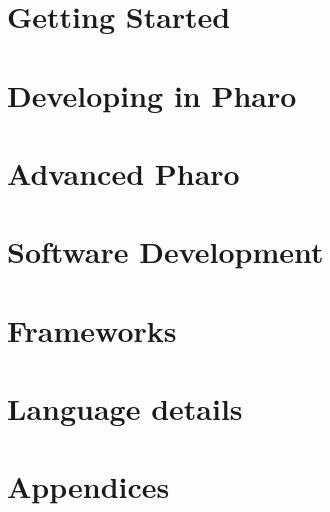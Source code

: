 \documentclass[a4paper,10pt,twoside]{book}
\begin{document}
\part{Getting Started}




\part{Developing in Pharo}







\part{Advanced Pharo}


\part{Software Development}

%
%
%

\part{Frameworks}

%



\part{Language details}

%
%


\appendix
\part{Appendices}



{\small\raggedright\printindex}
\pagestyle{empty}
\cleardoublepage
~ %
\cleardoublepage
~ %
\cleardoublepage
\end{document}
